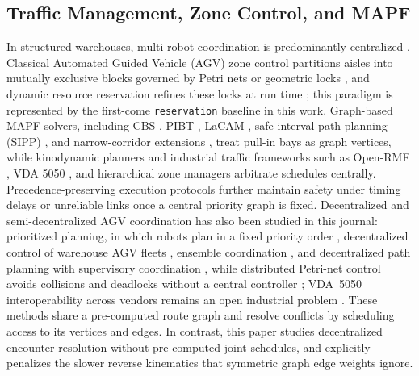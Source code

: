 \subsection{Traffic Management, Zone Control, and MAPF}
In structured warehouses, multi-robot coordination is predominantly centralized \cite{fragapane2021planning}. Classical Automated Guided Vehicle (AGV) zone control partitions aisles into mutually exclusive blocks governed by Petri nets or geometric locks \cite{fanti2002event}, and dynamic resource reservation refines these locks at run time \cite{verma2024traffic}; this paradigm is represented by the first-come \texttt{reservation} baseline in this work. Graph-based MAPF solvers, including CBS \cite{sharon2015cbs}, PIBT \cite{okumura2022pibt}, LaCAM \cite{okumura2023lacam}, safe-interval path planning (SIPP) \cite{phillips2011sipp}, and narrow-corridor extensions \cite{experience2024narrow,macga2025,singh2023conflict}, treat pull-in bays as graph vertices, while kinodynamic planners \cite{wen2022clmapf,dbecbs2025} and industrial traffic frameworks such as Open-RMF \cite{openrmf}, VDA 5050 \cite{vda5050}, and hierarchical zone managers \cite{hiertraffic2023} arbitrate schedules centrally. Precedence-preserving execution protocols \cite{cap2016provably,mannucci2019provably,honig2019persistent} further maintain safety under timing delays or unreliable links once a central priority graph is fixed. Decentralized and semi-decentralized AGV coordination has also been studied in this journal: prioritized planning, in which robots plan in a fixed priority order \cite{cap2015prioritized}, decentralized control of warehouse AGV fleets \cite{draganjac2016decentralized}, ensemble coordination \cite{digani2015ensemble}, and decentralized path planning with supervisory coordination \cite{proia2026decentralized}, while distributed Petri-net control avoids collisions and deadlocks without a central controller \cite{zhou2017collision}; VDA~5050 interoperability across vendors remains an open industrial problem \cite{vanduijkeren2023industrial}. These methods share a pre-computed route graph and resolve conflicts by scheduling access to its vertices and edges. In contrast, this paper studies decentralized encounter resolution without pre-computed joint schedules, and explicitly penalizes the slower reverse kinematics that symmetric graph edge weights ignore.

